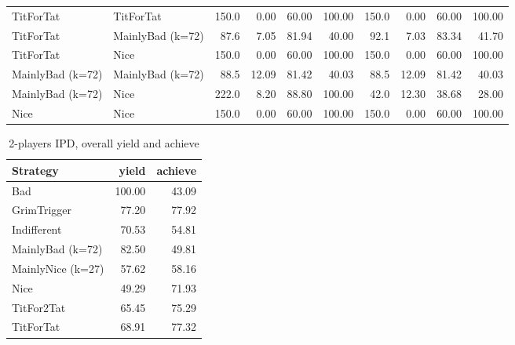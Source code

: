 \documentclass[journal,a4paper,10pt,twoside]{IEEEtran} %
\begin{document}
\begin{table}[ht]
\begin{tabular}{ll|rrrr|rrrr}
		TitForTat         & TitForTat         & 150.0 &  0.00 &  60.00 &     100.00 & 150.0 &  0.00 &  60.00 &     100.00 \\
		TitForTat         & MainlyBad (k=72)  &  87.6 &  7.05 &  81.94 &      40.00 &  92.1 &  7.03 &  83.34 &      41.70 \\
		TitForTat         & Nice              & 150.0 &  0.00 &  60.00 &     100.00 & 150.0 &  0.00 &  60.00 &     100.00 \\
		MainlyBad (k=72)  & MainlyBad (k=72)  &  88.5 & 12.09 &  81.42 &      40.03 &  88.5 & 12.09 &  81.42 &      40.03 \\
		MainlyBad (k=72)  & Nice              & 222.0 &  8.20 &  88.80 &     100.00 &  42.0 & 12.30 &  38.68 &      28.00 \\
		Nice              & Nice              & 150.0 &  0.00 &  60.00 &     100.00 & 150.0 &  0.00 &  60.00 &     100.00 \\ \bottomrule
	\end{tabular}
\end{table}

\begin{table}[ht]
	\caption{2-players IPD, overall yield and achieve}
	\label{tab:ipd2pavg}
	\centering
	\begin{tabular}{l|rr} \toprule
			  Strategy &   yield &  achieve \\ \midrule
				   Bad &  100.00 &    43.09 \\
		   GrimTrigger &   77.20 &    77.92 \\
		   Indifferent &   70.53 &    54.81 \\
	  MainlyBad (k=72) &   82.50 &    49.81 \\
	 MainlyNice (k=27) &   57.62 &    58.16 \\
				  Nice &   49.29 &    71.93 \\
			TitFor2Tat &   65.45 &    75.29 \\
			 TitForTat &   68.91 &    77.32 \\ \bottomrule
	\end{tabular}
\end{table}
\end{document}
